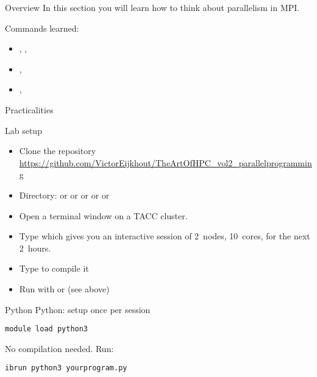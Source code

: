 
\begin{numberedframe}{Overview}
  In this section you will learn how to think about parallelism in
  MPI.

  Commands learned:
  \begin{itemize}
  \item
    , ,
  \item 
    , 
  \item 
    , 
  \end{itemize}
\end{numberedframe}

 {Practicalities}

\begin{tacc}
\begin{numberedframe}{Lab setup}
  \begin{itemize}
  \item Clone the repository\\
    \url{https://github.com/VictorEijkhout/TheArtOfHPC_vol2_parallelprogramming}
  \item Directory:  or  or  or 
    or  or 
  \item Open a terminal window on a TACC cluster.
  \item Type  which gives
    you an interactive session of 2~nodes, 10~cores, for the next
    2~hours.
  \item Type  to compile it
  \item Run with  or  (see above)
  \end{itemize}
\end{numberedframe}
\end{tacc}

\begin{python}
  \addtocounter{slidecount}{-1}
\begin{numberedframe}{Python}
 Python: setup once per session
\begin{verbatim}
module load python3
\end{verbatim}
No compilation needed. Run:
\begin{verbatim}
ibrun python3 yourprogram.py
\end{verbatim}
\end{numberedframe}
\end{python}


